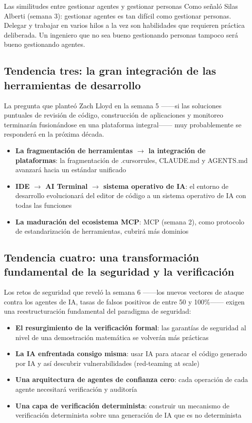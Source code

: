 \documentclass[a4paper]{article}
\begin{document}
\begin{knowledgebox}{Las similitudes entre gestionar agentes y gestionar personas}
Como señaló Silas Alberti (semana 3): gestionar agentes es tan difícil como gestionar personas. Delegar y trabajar en varios hilos a la vez son habilidades que requieren práctica deliberada. Un ingeniero que no sea bueno gestionando personas tampoco será bueno gestionando agentes.
\end{knowledgebox}

\subsection{Tendencia tres: la gran integración de las herramientas de desarrollo}

La pregunta que planteó Zach Lloyd en la semana 5 ——si las soluciones puntuales de revisión de código, construcción de aplicaciones y monitoreo terminarán fusionándose en una plataforma integral—— muy probablemente se responderá en la próxima década.

\begin{itemize}
    \item \textbf{La fragmentación de herramientas $\rightarrow$ la integración de plataformas}: la fragmentación de .cursorrules, CLAUDE.md y AGENTS.md avanzará hacia un estándar unificado
    \item \textbf{IDE $\rightarrow$ AI Terminal $\rightarrow$ sistema operativo de IA}: el entorno de desarrollo evolucionará del editor de código a un sistema operativo de IA con todas las funciones
    \item \textbf{La maduración del ecosistema MCP}: MCP (semana 2), como protocolo de estandarización de herramientas, cubrirá más dominios
\end{itemize}

\subsection{Tendencia cuatro: una transformación fundamental de la seguridad y la verificación}

Los retos de seguridad que reveló la semana 6 ——los nuevos vectores de ataque contra los agentes de IA, tasas de falsos positivos de entre 50 y 100\%—— exigen una reestructuración fundamental del paradigma de seguridad:

\begin{itemize}
    \item \textbf{El resurgimiento de la verificación formal}: las garantías de seguridad al nivel de una demostración matemática se volverán más prácticas
    \item \textbf{La IA enfrentada consigo misma}: usar IA para atacar el código generado por IA y así descubrir vulnerabilidades (red-teaming at scale)
    \item \textbf{Una arquitectura de agentes de confianza cero}: cada operación de cada agente necesitará verificación y auditoría
    \item \textbf{Una capa de verificación determinista}: construir un mecanismo de verificación determinista sobre una generación de IA que es no determinista
\end{itemize}
\end{document}
